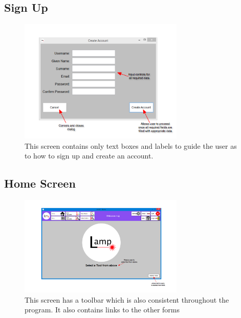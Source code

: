 \documentclass[oneside,openany,11pt,a4paper]{report}
\begin{document}
\subsection{Sign Up}
\begin{figure}[H]
	\centering
	\includegraphics[width=0.7\textwidth]{screen/signup.png}
	\caption{This screen contains only text boxes and labels to guide the user as to how to sign up and create an account.}
\end{figure}

\subsection{Home Screen}
\begin{figure}[H]
	\centering
	\includegraphics[width=0.7\textwidth]{screen/home.png}
	\caption{This screen has a toolbar which is also consistent throughout the program. It also contains links to the other forms }
\end{figure}
\end{document}
